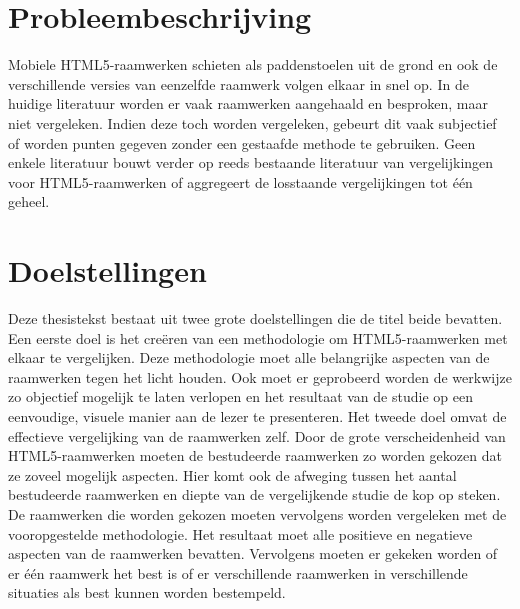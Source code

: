\section{Probleembeschrijving} %
Mobiele HTML5-raamwerken schieten als paddenstoelen uit de grond en ook de verschillende versies van eenzelfde raamwerk volgen elkaar in snel op.
In de huidige literatuur worden er vaak raamwerken aangehaald en besproken, maar niet vergeleken.
Indien deze toch worden vergeleken, gebeurt dit vaak subjectief of worden punten gegeven zonder een gestaafde methode te gebruiken.
Geen enkele literatuur bouwt verder op reeds bestaande literatuur van vergelijkingen voor HTML5-raamwerken of aggregeert de losstaande vergelijkingen tot één geheel.

\section{Doelstellingen} %
Deze thesistekst bestaat uit twee grote doelstellingen die de titel beide bevatten.
Een eerste doel is het creëren van een methodologie om HTML5-raamwerken met elkaar te vergelijken.
Deze methodologie moet alle belangrijke aspecten van de raamwerken tegen het licht houden.
Ook moet er geprobeerd worden de werkwijze zo objectief mogelijk te laten verlopen en het resultaat van de studie op een eenvoudige,  visuele manier aan de lezer te presenteren.
Het tweede doel omvat de effectieve vergelijking van de raamwerken zelf.
Door de grote verscheidenheid van HTML5-raamwerken moeten de bestudeerde raamwerken zo worden gekozen dat ze zoveel mogelijk aspecten.
Hier komt ook de afweging tussen het aantal bestudeerde raamwerken en diepte van de vergelijkende studie de kop op steken.
De raamwerken die worden gekozen moeten vervolgens worden vergeleken met de vooropgestelde methodologie.
Het resultaat moet alle positieve en negatieve aspecten van de raamwerken bevatten.
Vervolgens moeten er gekeken worden of er één raamwerk het best is of er verschillende raamwerken in verschillende situaties als best kunnen worden bestempeld.

